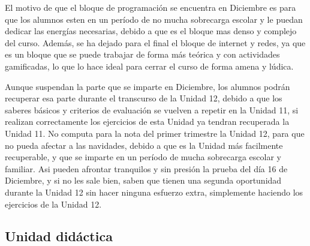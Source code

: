 \documentclass[a4paper,12pt]{article}
\begin{document}
El motivo de que el bloque de programación se encuentra en Diciembre es para que los alumnos esten en un período de no mucha sobrecarga escolar
y le puedan dedicar las energías necesarias, debido a que es el bloque mas denso y complejo del curso. Adem\'as, se ha dejado para el final el bloque
de internet y redes, ya que es un bloque que se puede trabajar de forma m\'as te\'orica y con actividades gamificadas, lo que lo hace ideal para cerrar 
el curso de forma amena y l\'udica.

Aunque suspendan la parte que se imparte en Diciembre, los alumnos podr\'an recuperar esa parte durante el transcurso de la Unidad 12, debido a que los
saberes b\'asicos y criterios de evaluaci\'on se vuelven a repetir en la Unidad 11, si realizan correctamente los ejercicios de esta Unidad ya tendran recuperada
la Unidad 11. No computa para la nota del primer trimestre la Unidad 12, para que no pueda afectar a las navidades, debido a que es la Unidad más facilmente recuperable,
y que se imparte en un período de mucha sobrecarga escolar y familiar. Asi pueden afrontar tranquilos y sin presi\'on la prueba del día 16 de Diciembre, y si no les sale bien,
saben que tienen una segunda oportunidad durante la Unidad 12 sin hacer ninguna esfuerzo extra, simplemente haciendo los ejercicios de la Unidad 12.


\subsection{Unidad didáctica}
\end{document}
